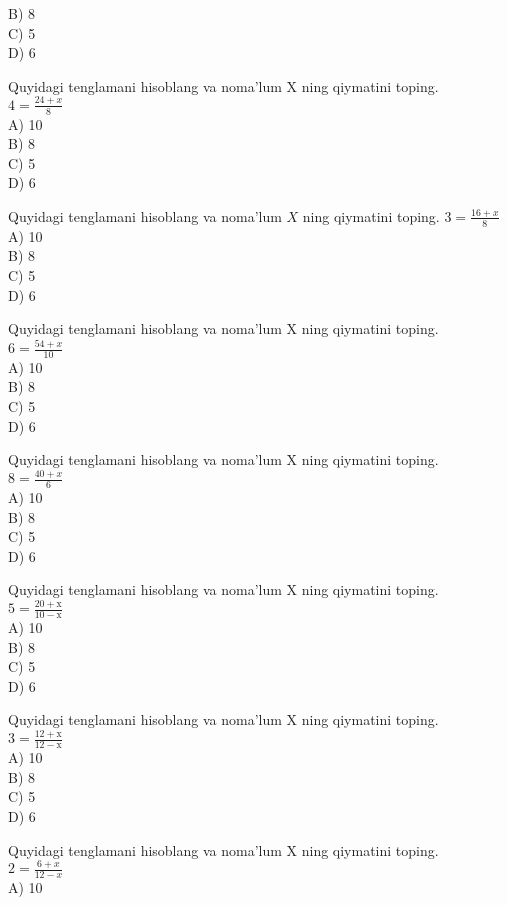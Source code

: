 B) 8\\
C) 5\\
D) 6
  \item Quyidagi tenglamani hisoblang va noma'lum X ning qiymatini toping.\\
$4=\frac{24+x}{8}$\\
A) 10\\
B) 8\\
C) 5\\
D) 6
  \item Quyidagi tenglamani hisoblang va noma'lum $X$ ning qiymatini toping. $3=\frac{16+x}{8}$\\
A) 10\\
B) 8\\
C) 5\\
D) 6
  \item Quyidagi tenglamani hisoblang va noma'lum X ning qiymatini toping.\\
$6=\frac{54+x}{10}$\\
A) 10\\
B) 8\\
C) 5\\
D) 6
  \item Quyidagi tenglamani hisoblang va noma'lum X ning qiymatini toping.\\
$8=\frac{40+x}{6}$\\
A) 10\\
B) 8\\
C) 5\\
D) 6
  \item Quyidagi tenglamani hisoblang va noma'lum X ning qiymatini toping.\\
$5=\frac{20+\mathrm{x}}{10-\mathrm{x}}$\\
A) 10\\
B) 8\\
C) 5\\
D) 6\\
  \item Quyidagi tenglamani hisoblang va noma'lum X ning qiymatini toping.\\
$3=\frac{12+\mathrm{x}}{12-\mathrm{x}}$\\
A) 10\\
B) 8\\
C) 5\\
D) 6
  \item Quyidagi tenglamani hisoblang va noma'lum X ning qiymatini toping.\\
$2=\frac{6+x}{12-x}$\\
A) 10\\

